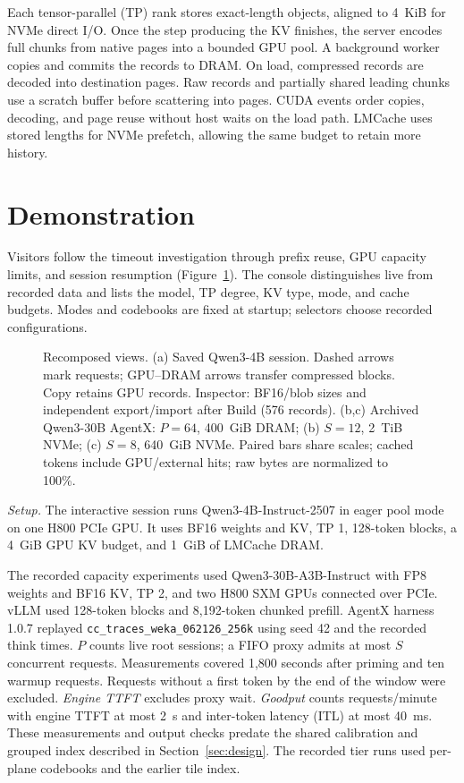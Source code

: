 \documentclass[conference]{IEEEtran}
\begin{document}
Each tensor-parallel (TP) rank stores exact-length objects, aligned to
4~KiB for NVMe direct I/O. Once the step producing the KV finishes, the server
encodes full chunks from native pages into a bounded GPU pool.
A background worker copies and commits the records to DRAM. On load,
compressed records are decoded into destination pages. Raw records and
partially shared leading chunks use a scratch buffer before scattering
into pages. CUDA events order copies,
decoding, and page reuse without host waits on the load path. LMCache uses
stored lengths for NVMe prefetch, allowing the same budget to retain more
history.

\section{Demonstration}
\label{sec:demo}
Visitors follow the timeout investigation through prefix reuse, GPU
capacity limits, and session resumption (Figure~\ref{fig:views}). The console
distinguishes live from recorded data and lists the model, TP degree, KV
type, mode, and cache budgets. Modes and codebooks are fixed at startup;
selectors choose recorded configurations.

\begin{figure}[!b]
\centering

\caption{Recomposed views. (a) Saved Qwen3-4B session.
Dashed arrows mark requests; GPU--DRAM arrows transfer compressed blocks.
Copy retains GPU records. Inspector: BF16/blob sizes and independent
export/import after Build (576 records).
(b,c) Archived Qwen3-30B AgentX: $P=64$, 400~GiB DRAM;
(b) $S=12$, 2~TiB NVMe; (c) $S=8$, 640~GiB NVMe.
Paired bars share scales; cached tokens include GPU/external hits;
raw bytes are normalized to 100\%.}
\label{fig:views}
\end{figure}

\emph{Setup.} The interactive session runs Qwen3-4B-Instruct-2507 in eager
pool mode on one H800 PCIe GPU. It uses BF16 weights and KV, TP 1,
128-token blocks, a 4~GiB GPU KV budget, and 1~GiB of LMCache DRAM.

The recorded capacity experiments used Qwen3-30B-A3B-Instruct
with FP8 weights and BF16 KV, TP 2, and two H800 SXM GPUs connected over
PCIe. vLLM used 128-token blocks and 8,192-token chunked prefill.
AgentX harness 1.0.7 replayed \texttt{cc\_traces\_weka\_062126\_256k} using
seed 42 and the recorded think times. $P$ counts live root sessions; a FIFO
proxy admits at most $S$ concurrent requests. Measurements covered
1,800 seconds after priming and ten warmup requests. Requests without a
first token by the end of the window were excluded. \emph{Engine TTFT} excludes
proxy wait. \emph{Goodput} counts requests/minute with engine TTFT at most
2~s and inter-token latency (ITL) at most 40~ms.
These measurements and output checks predate the shared calibration and
grouped index described in Section~\ref{sec:design}. The recorded tier runs
used per-plane codebooks and the earlier tile index.
\end{document}
